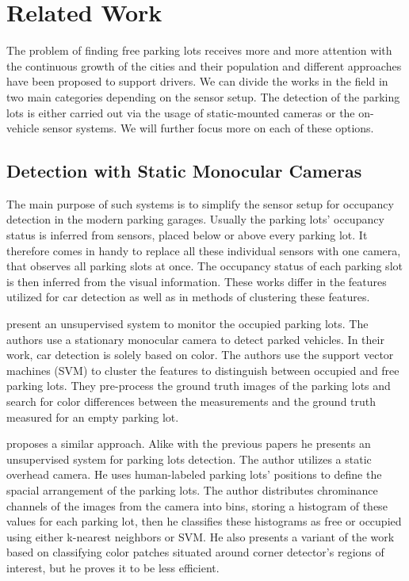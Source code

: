 \chapter{Related Work}
\label{cha:related_works}

The problem of finding free parking lots receives more and more attention with
the continuous growth of the cities and their population and different
approaches have been proposed to support drivers. We can divide the works in
the field in two main categories depending on the sensor setup. The detection
of the parking lots is either carried out via the usage of static-mounted
cameras or the on-vehicle sensor systems. We will further focus more on each
of these options.

\section*{Detection with Static Monocular Cameras} %
\label{sec:detection_with_monocular_cameras}

The main purpose of such systems is to simplify the sensor setup for occupancy
detection in the modern parking garages. Usually the parking lots' occupancy
status is inferred from sensors, placed below or above every parking lot. It
therefore comes in handy to replace all these individual sensors with one
camera, that observes all parking slots at once. The occupancy status of each
parking slot is then inferred from the visual information. These works differ
in the features utilized for car detection as well as in methods of clustering
these features.

\citet{qizhang06} present an unsupervised system to monitor the occupied
parking lots. The authors use a stationary monocular camera to detect parked
vehicles. In their work, car detection is solely based on color. The authors
use the support vector machines (SVM) to cluster the features to distinguish
between occupied and free parking lots. They pre-process the ground truth
images of the parking lots and search for color differences between the
measurements and the ground truth measured for an empty parking lot.

\citet{nicolastrue} proposes a similar approach. Alike with the previous papers
he presents an unsupervised system for parking lots detection. The author
utilizes a static overhead camera. He uses human-labeled parking lots'
positions to define the spacial arrangement of the parking lots. The author
distributes chrominance channels of the images from the camera into bins,
storing a histogram of these values for each parking lot, then he classifies
these histograms as free or occupied using either k-nearest neighbors or
SVM\@. He also presents a variant of the work based on classifying color
patches situated around corner detector's regions of interest, but he proves
it to be less efficient.

